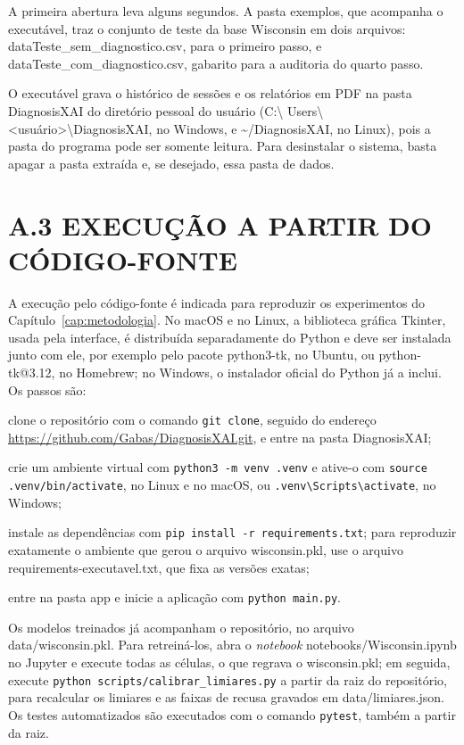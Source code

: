 A primeira abertura leva alguns segundos. A pasta exemplos, que acompanha o
executável, traz o conjunto de teste da base Wisconsin em dois arquivos:
dataTeste\_sem\_diagnostico.csv, para o primeiro passo, e
dataTeste\_com\_diagnostico.csv, gabarito para a auditoria do quarto passo.

O executável grava o histórico de sessões e os relatórios em PDF na pasta
DiagnosisXAI do diretório pessoal do usuário (C:\textbackslash
Users\textbackslash \textless usuário\textgreater \textbackslash DiagnosisXAI,
no Windows, e \textasciitilde/DiagnosisXAI, no Linux), pois a pasta do programa
pode ser somente leitura. Para desinstalar o sistema, basta apagar a pasta
extraída e, se desejado, essa pasta de dados.

\section*{A.3 EXECUÇÃO A PARTIR DO CÓDIGO-FONTE}

A execução pelo código-fonte é indicada para reproduzir os experimentos do
Capítulo~\ref{cap:metodologia}. No macOS e no Linux, a biblioteca gráfica
Tkinter, usada pela interface, é distribuída separadamente do Python e deve ser
instalada junto com ele, por exemplo pelo pacote python3-tk, no Ubuntu, ou
python-tk@3.12, no Homebrew; no Windows, o instalador oficial do Python já a
inclui. Os passos são:

\begin{alineas}
    \item clone o repositório com o comando \texttt{git clone}, seguido do
          endereço \url{https://github.com/Gabas/DiagnosisXAI.git}, e entre na
          pasta DiagnosisXAI;
    \item crie um ambiente virtual com \texttt{python3 -m venv .venv} e
          ative-o com \texttt{source .venv/bin/activate}, no Linux e no macOS,
          ou \texttt{.venv\textbackslash Scripts\textbackslash activate}, no
          Windows;
    \item instale as dependências com
          \texttt{pip install -r requirements.txt}; para reproduzir exatamente o
          ambiente que gerou o arquivo wisconsin.pkl, use o arquivo
          requirements-executavel.txt, que fixa as versões exatas;
    \item entre na pasta app e inicie a aplicação com
          \texttt{python main.py}.
\end{alineas}

Os modelos treinados já acompanham o repositório, no arquivo
data/wisconsin.pkl. Para retreiná-los, abra o \textit{notebook}
notebooks/Wisconsin.ipynb no Jupyter e execute todas as células, o que regrava o
wisconsin.pkl; em seguida, execute \texttt{python scripts/calibrar\_limiares.py}
a partir da raiz do repositório, para recalcular os limiares e as faixas de
recusa gravados em data/limiares.json. Os testes automatizados são executados
com o comando \texttt{pytest}, também a partir da raiz.

